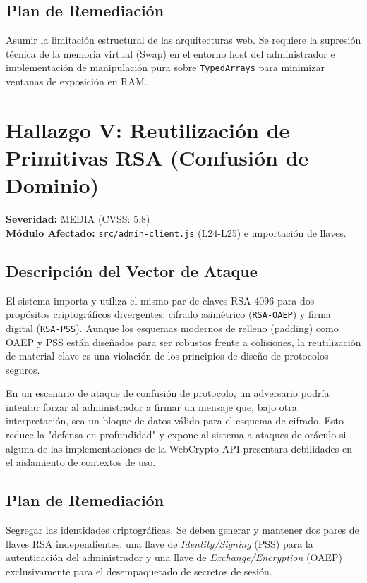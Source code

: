 \documentclass[12pt, a4paper]{article}
\begin{document}
\subsection{Plan de Remediación}
Asumir la limitación estructural de las arquitecturas web. Se requiere la supresión técnica de la memoria virtual (Swap) en el entorno host del administrador e implementación de manipulación pura sobre \texttt{TypedArrays} para minimizar ventanas de exposición en RAM.

\section{Hallazgo V: Reutilización de Primitivas RSA (Confusión de Dominio)}
\textbf{Severidad:} MEDIA (CVSS: 5.8)\\
\textbf{Módulo Afectado:} \texttt{src/admin-client.js} (L24-L25) e importación de llaves.

\subsection{Descripción del Vector de Ataque}
El sistema importa y utiliza el mismo par de claves RSA-4096 para dos propósitos criptográficos divergentes: cifrado asimétrico (\texttt{RSA-OAEP}) y firma digital (\texttt{RSA-PSS}). Aunque los esquemas modernos de relleno (padding) como OAEP y PSS están diseñados para ser robustos frente a colisiones, la reutilización de material clave es una violación de los principios de diseño de protocolos seguros. 

En un escenario de ataque de confusión de protocolo, un adversario podría intentar forzar al administrador a firmar un mensaje que, bajo otra interpretación, sea un bloque de datos válido para el esquema de cifrado. Esto reduce la "defensa en profundidad" y expone al sistema a ataques de oráculo si alguna de las implementaciones de la WebCrypto API presentara debilidades en el aislamiento de contextos de uso.

\subsection{Plan de Remediación}
Segregar las identidades criptográficas. Se deben generar y mantener dos pares de llaves RSA independientes: una llave de \textit{Identity/Signing} (PSS) para la autenticación del administrador y una llave de \textit{Exchange/Encryption} (OAEP) exclusivamente para el desempaquetado de secretos de sesión.
\end{document}
